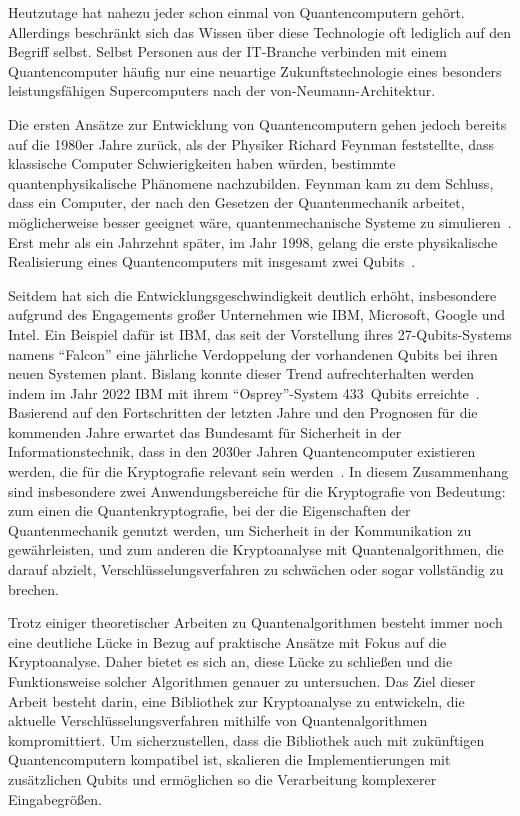 \documentclass[a4paper,journal]{IEEEtran}
\begin{document}
Heutzutage hat nahezu jeder schon einmal von Quantencomputern gehört.
Allerdings beschränkt sich das Wissen über diese Technologie oft lediglich auf den Begriff selbst.
Selbst Personen aus der IT-Branche verbinden mit einem Quantencomputer häufig nur
eine neuartige Zukunftstechnologie eines besonders leistungsfähigen Supercomputers nach der von-Neumann-Architektur.

Die ersten Ansätze zur Entwicklung von Quantencomputern gehen jedoch bereits auf die 1980er Jahre zurück,
als der Physiker Richard Feynman feststellte,
dass klassische Computer Schwierigkeiten haben würden,
bestimmte quantenphysikalische Phänomene nachzubilden.
Feynman kam zu dem Schluss, dass ein Computer,
der nach den Gesetzen der Quantenmechanik arbeitet,
möglicherweise besser geeignet wäre,
quantenmechanische Systeme zu simulieren~\cite{Feynman:1982}.
Erst mehr als ein Jahrzehnt später, im Jahr 1998,
gelang die erste physikalische Realisierung eines Quantencomputers
mit insgesamt zwei Qubits~\cite{Chuang:1998ExperimentalIO}.

Seitdem hat sich die Entwicklungsgeschwindigkeit deutlich erhöht,
insbesondere aufgrund des Engagements großer Unternehmen wie IBM, Microsoft, Google und Intel.
Ein Beispiel dafür ist IBM,
das seit der Vorstellung ihres 27-Qubits-Systems namens "`Falcon"'
eine jährliche Verdoppelung der vorhandenen Qubits bei ihren neuen Systemen plant.
Bislang konnte dieser Trend aufrechterhalten werden
indem im Jahr 2022 IBM mit ihrem "`Osprey"'-System 433~Qubits erreichte~\cite{IBM:2022}.
Basierend auf den Fortschritten der letzten Jahre und
den Prognosen für die kommenden Jahre erwartet
das Bundesamt für Sicherheit in der Informationstechnik,
dass in den 2030er Jahren Quantencomputer existieren werden,
die für die Kryptografie relevant sein werden~\cite{BSI:2023}.
In diesem Zusammenhang sind insbesondere zwei Anwendungsbereiche für die Kryptografie von Bedeutung:
zum einen die Quantenkryptografie, bei der die Eigenschaften der Quantenmechanik genutzt werden,
um Sicherheit in der Kommunikation zu gewährleisten, und
zum anderen die Kryptoanalyse mit Quantenalgorithmen, die darauf abzielt,
Verschlüsselungsverfahren zu schwächen oder sogar vollständig zu brechen.

Trotz einiger theoretischer Arbeiten zu Quantenalgorithmen
besteht immer noch eine deutliche Lücke in Bezug auf praktische Ansätze mit Fokus auf die Kryptoanalyse.
Daher bietet es sich an, diese Lücke zu schließen und die Funktionsweise solcher Algorithmen genauer zu untersuchen.
Das Ziel dieser Arbeit besteht darin, eine Bibliothek zur Kryptoanalyse zu entwickeln,
die aktuelle Verschlüsselungsverfahren mithilfe von Quantenalgorithmen kompromittiert.
Um sicherzustellen, dass die Bibliothek auch mit zukünftigen Quantencomputern kompatibel ist,
skalieren die Implementierungen mit zusätzlichen Qubits und
ermöglichen so die Verarbeitung komplexerer Eingabegrößen.
\end{document}
